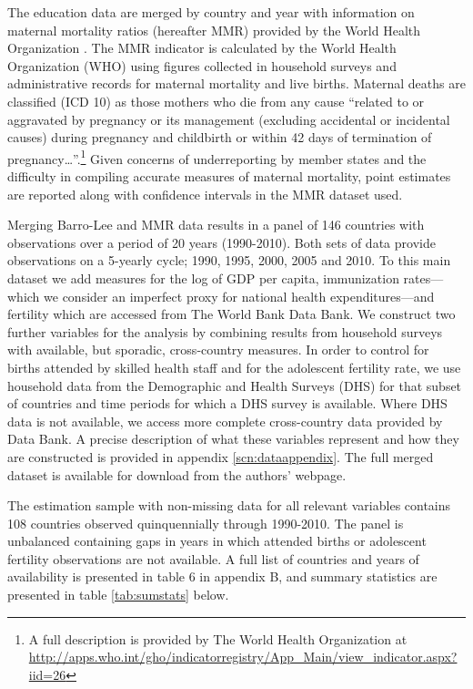 \documentclass{article}[12pt,subeqn]
\begin{document}
\begin{spacing}{1.4}
The education data are merged by country and year with information on maternal mortality ratios (hereafter MMR) provided by the 
World Health Organization \citep{WHO2012}. The MMR indicator is calculated by the World Health Organization 
(WHO) using figures collected in household surveys and administrative records for maternal mortality and live births. Maternal 
deaths are classified (ICD 10) as those mothers who die from any cause ``related to or aggravated by pregnancy or its management 
(excluding accidental or incidental causes) during pregnancy and childbirth or within 42 days of termination of pregnancy\ldots''.\footnote{A 
full description is provided by The World Health Organization at \url{http://apps.who.int/gho/indicatorregistry/App_Main/view_indicator.aspx?iid=26}} 
Given concerns of underreporting by member states and the difficulty in compiling accurate measures of maternal mortality, 
point estimates are reported along with confidence intervals in the MMR dataset used.

Merging Barro-Lee and MMR data results in a panel of 146 countries with observations over a period of 20
years (1990-2010). Both sets of data provide observations on a 5-yearly cycle; 1990, 1995, 2000, 2005 and
2010. To this main dataset we add measures for the log of GDP per capita, immunization rates—which we
consider an imperfect proxy for national health expenditures—and fertility which are accessed from The
World Bank Data Bank. We construct two further variables for the analysis by combining results from
household surveys with available, but sporadic, cross-country measures. In order to control for births
attended by skilled health staff and for the adolescent fertility rate, we use household data from the
Demographic and Health Surveys (DHS) for that subset of countries and time periods for which a DHS
survey is available. Where DHS data is not available, we access more complete cross-country data provided
by \citet{WorldBank2012} Data Bank. A precise description of what these variables represent and how they are
constructed is provided in appendix \ref{scn:dataappendix}.  The full merged dataset is available for
download from the authors' webpage.

The estimation sample with non-missing data for all relevant variables contains 108 countries observed
quinquennially through 1990-2010. The panel is unbalanced containing gaps in years in which attended
births or adolescent fertility observations are not available. A full list of countries and years of availability is
presented in table 6 in appendix B, and summary statistics are presented in table \ref{tab:sumstats} below.


\end{spacing}
\end{document}
